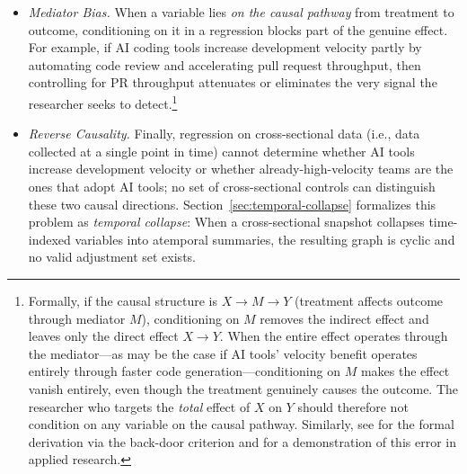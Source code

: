 \begin{itemize}[leftmargin=15pt]
{    Intuitively, once we know the value of a common effect, learning about one cause provides information about the other: Among popular projects, if a project did \emph{not} benefit from AI tool adoption (and its associated visibility), it likely achieved popularity through high development velocity, creating a negative association between AI adoption and development velocity that is purely an artifact of the conditioning.
    See Section~\ref{sec:primer-dags} for more details on DAGs, \citet[Ch.~1, \S1.2.3]{pearl2009causality} for the formal $d$-separation proof, and \citet{elwert2014endogenous} for an accessible treatment with social-science examples.}
    \item \emph{Mediator Bias.}
    When a variable lies \emph{on the causal pathway} from treatment to outcome, conditioning on it in a regression blocks part of the genuine effect.
    For example, if AI coding tools increase development velocity partly by automating code review and accelerating pull request throughput, then controlling for PR throughput attenuates or eliminates the very signal the researcher seeks to detect.\footnote{Formally, if the causal structure is $X \to M \to Y$ (treatment affects outcome through mediator $M$), conditioning on $M$ removes the indirect effect and leaves only the direct effect $X \to Y$.
    When the entire effect operates through the mediator---as may be the case if AI tools' velocity benefit operates entirely through faster code generation---conditioning on $M$ makes the effect vanish entirely, even though the treatment genuinely causes the outcome.
    The researcher who targets the \emph{total} effect of $X$ on $Y$ should therefore not condition on any variable on the causal pathway.
    Similarly, see \citet[Ch.~3, \S3.3.1]{pearl2009causality} for the formal derivation via the back-door criterion and \citet{wysocki2022statistical} for a demonstration of this error in applied research.}
    \item \emph{Reverse Causality.}
    Finally, regression on cross-sectional data (i.e., data collected at a single point in time) cannot determine whether AI tools increase development velocity or whether already-high-velocity teams are the ones that adopt AI tools; no set of cross-sectional controls can distinguish these two causal directions.
    Section~\ref{sec:temporal-collapse} formalizes this problem as \emph{temporal collapse}: When a cross-sectional snapshot collapses time-indexed variables into atemporal summaries, the resulting graph is cyclic and no valid adjustment set exists.
\end{itemize}
